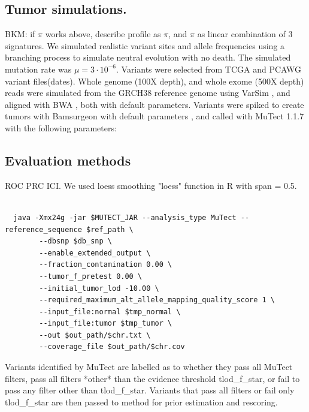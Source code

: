 \documentclass[a4,center,fleqn]{NAR}
\newcommand{\bkmcomment}[1]{{\color{blue}BKM: #1}}
\begin{document}
\subsection{Tumor simulations.}
\bkmcomment{if $\pi$ works above, describe profile as $\pi$, and $\pi$ as linear combination of 3 signatures.}
We simulated realistic variant sites and allele frequencies using a branching process to simulate neutral evolution with no death.
The simulated mutation rate was $\mu = 3\cdot10^{-6}$.
Variants were selected from TCGA and PCAWG variant files(dates).
Whole genome (100X depth), and whole exome (500X depth) reads were simulated from the GRCH38 reference genome using VarSim \cite{Mu2015}, and aligned with BWA \cite{Li2009a}, both with default parameters.
Variants were spiked to create tumors with Bamsurgeon with default parameters \cite{Ewing2015a},
and called with MuTect 1.1.7 \cite{Cibulskis2013} with the following parameters:

\subsection{Evaluation methods}
ROC
PRC
ICI. We used loess smoothing "loess" function in R with span = 0.5.
\begin{tiny}
\begin{verbatim}

  java -Xmx24g -jar $MUTECT_JAR --analysis_type MuTect --reference_sequence $ref_path \
        --dbsnp $db_snp \
        --enable_extended_output \
        --fraction_contamination 0.00 \
        --tumor_f_pretest 0.00 \
        --initial_tumor_lod -10.00 \
        --required_maximum_alt_allele_mapping_quality_score 1 \
        --input_file:normal $tmp_normal \
        --input_file:tumor $tmp_tumor \
        --out $out_path/$chr.txt \
        --coverage_file $out_path/$chr.cov

\end{verbatim}
\end{tiny}
Variants identified by MuTect are labelled as to whether they pass all MuTect filters, pass all filters *other* than the evidence threshold \textrm{tlod\_f\_star}, or fail to pass any filter other than \textrm{tlod\_f\_star}. Variants that pass all filters or fail only \textrm{tlod\_f\_star} are then passed to {method} for prior estimation and rescoring.
\end{document}
